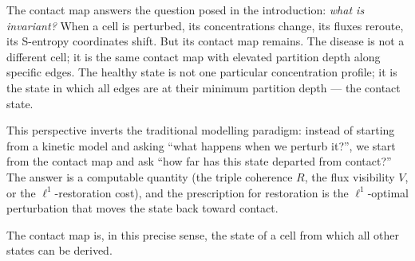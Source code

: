 \documentclass[11pt,twocolumn]{article}
\theoremstyle{plain}
\theoremstyle{definition}
\begin{document}
The contact map answers the question posed in the introduction: \emph{what is
invariant?} When a cell is perturbed, its concentrations change, its fluxes
reroute, its S-entropy coordinates shift. But its contact map remains. The
disease is not a different cell; it is the same contact map with elevated
partition depth along specific edges. The healthy state is not one particular
concentration profile; it is the state in which all edges are at their minimum
partition depth --- the contact state.

This perspective inverts the traditional modelling paradigm: instead of
starting from a kinetic model and asking ``what happens when we perturb it?'',
we start from the contact map and ask ``how far has this state departed from
contact?'' The answer is a computable quantity (the triple coherence $R$, the
flux visibility $V$, or the $\ell^1$-restoration cost), and the prescription
for restoration is the $\ell^1$-optimal perturbation that moves the state back
toward contact.

The contact map is, in this precise sense, the state of a cell from which all
other states can be derived.

\printbibliography
\end{document}
